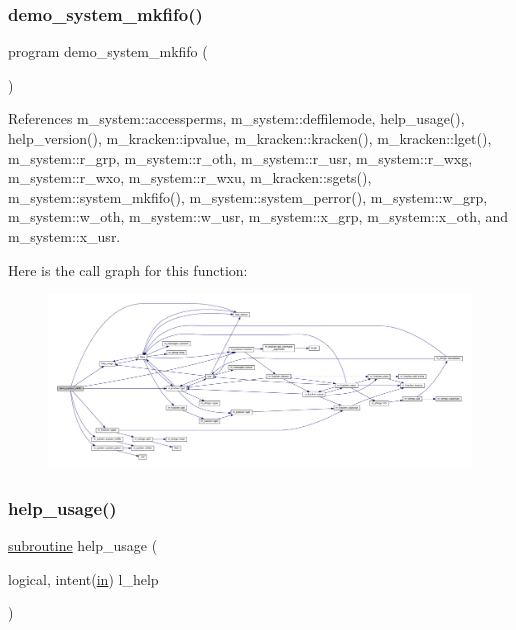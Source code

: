 \subsubsection{\texorpdfstring{demo\+\_\+system\+\_\+mkfifo()}{demo\_system\_mkfifo()}}
{\footnotesize\ttfamily program demo\+\_\+system\+\_\+mkfifo (\begin{DoxyParamCaption}{ }\end{DoxyParamCaption})}



References m\+\_\+system\+::accessperms, m\+\_\+system\+::deffilemode, help\+\_\+usage(), help\+\_\+version(), m\+\_\+kracken\+::ipvalue, m\+\_\+kracken\+::kracken(), m\+\_\+kracken\+::lget(), m\+\_\+system\+::r\+\_\+grp, m\+\_\+system\+::r\+\_\+oth, m\+\_\+system\+::r\+\_\+usr, m\+\_\+system\+::r\+\_\+wxg, m\+\_\+system\+::r\+\_\+wxo, m\+\_\+system\+::r\+\_\+wxu, m\+\_\+kracken\+::sgets(), m\+\_\+system\+::system\+\_\+mkfifo(), m\+\_\+system\+::system\+\_\+perror(), m\+\_\+system\+::w\+\_\+grp, m\+\_\+system\+::w\+\_\+oth, m\+\_\+system\+::w\+\_\+usr, m\+\_\+system\+::x\+\_\+grp, m\+\_\+system\+::x\+\_\+oth, and m\+\_\+system\+::x\+\_\+usr.

Here is the call graph for this function\+:
\nopagebreak
\begin{figure}[H]
\begin{center}
\leavevmode
\includegraphics[width=350pt]{__mkfifo_8f90_a6c58f22de022879b9913bc1c177c62ca_cgraph}
\end{center}
\end{figure}
\mbox{\label{__mkfifo_8f90_a3e09a3b52ee8fb04eeb93fe5761626a8}} 
\subsubsection{\texorpdfstring{help\+\_\+usage()}{help\_usage()}}
{\footnotesize\ttfamily \hyperlink{M__stopwatch_83_8txt_acfbcff50169d691ff02d4a123ed70482}{subroutine} help\+\_\+usage (\begin{DoxyParamCaption}\item[{logical, intent(\hyperlink{M__journal_83_8txt_afce72651d1eed785a2132bee863b2f38}{in})}]{l\+\_\+help }\end{DoxyParamCaption})}



